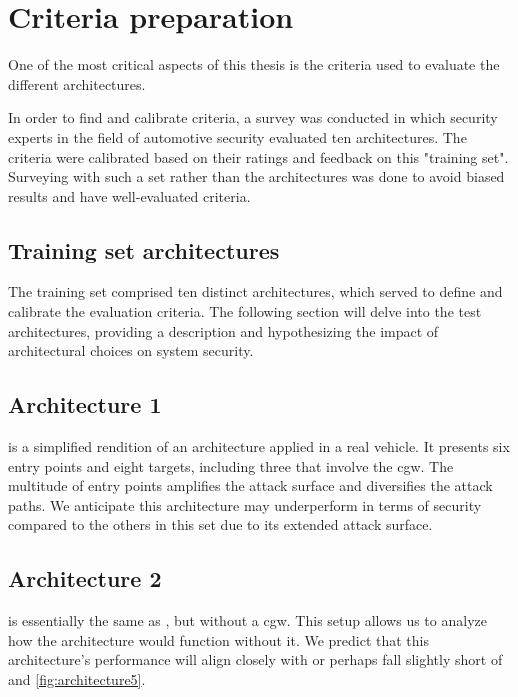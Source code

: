 \chapter{Criteria preparation}
\label{chp:introcriteria}

One of the most critical aspects of this thesis is the criteria used to evaluate the different architectures.

In order to find and calibrate criteria, a survey was conducted in which security experts in the field of automotive security evaluated ten architectures.
The criteria were calibrated based on their ratings and feedback on this "training set".
Surveying with such a set rather than the architectures was done to avoid biased results and have well-evaluated criteria.

\section{Training set architectures}
\label{sec:trainingarch}

The training set comprised ten distinct architectures, which served to define and calibrate the evaluation criteria. 
The following section will delve into the test architectures, 
providing a description and hypothesizing the impact of architectural choices on system security.

\section{Architecture 1}
\label{subsec:arch1}

 is a simplified rendition of an architecture applied in a real vehicle. 
It presents six entry points and eight targets, including three that involve the \acrshort{cgw}. 
The multitude of entry points amplifies the attack surface and diversifies the attack paths. 
We anticipate this architecture may underperform in terms of security compared to the others in this set due to its extended attack surface.

\section{Architecture 2}
\label{subsec:arch2}

 is essentially the same as , 
but without a \acrshort{cgw}.
This setup allows us to analyze how the architecture would function without it. 
We predict that this architecture's performance will align closely with or perhaps 
fall slightly short of  and \ref{fig:architecture5}.

